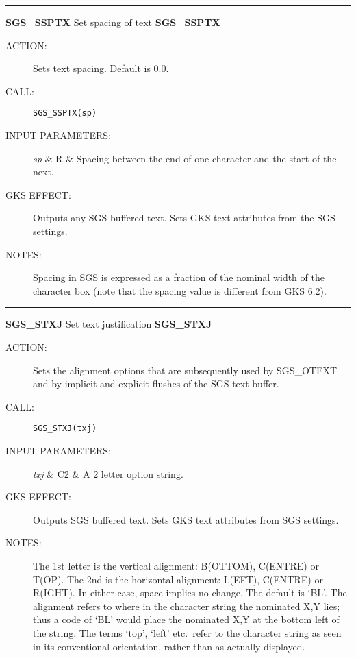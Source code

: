 \rule{\textwidth}{0.3mm}
{\Large {\bf SGS\_SSPTX} \hfill Set spacing of text \hfill {\bf SGS\_SSPTX}}
\begin{description}
\item [ACTION:]
Sets text spacing.
Default is 0.0.
\item [CALL:]
{\tt SGS\_SSPTX(sp)}
\item [INPUT PARAMETERS:]
\begin{params}
{\em sp}  & R  & Spacing between the end of one character and the start of the
next.
\end{params}
\item [GKS EFFECT:]
Outputs any SGS buffered text.
Sets GKS text attributes from the SGS settings.
\item [NOTES:]
Spacing in SGS is expressed as a fraction of the nominal width of the character
box (note that the spacing value is different from GKS 6.2).
\end{description}
\goodbreak

\rule{\textwidth}{0.3mm}
{\Large {\bf SGS\_STXJ} \hfill Set text justification \hfill {\bf SGS\_STXJ}}
\begin{description}
\item [ACTION:]
Sets the alignment options that are subsequently used by SGS\_OTEXT
and by implicit and explicit flushes of the SGS text buffer.
\item [CALL:]
{\tt SGS\_STXJ(txj)}
\item [INPUT PARAMETERS:]
\begin{params}
{\em txj}  & C2  & A 2 letter option string.
\end{params}
\item [GKS EFFECT:]
Outputs SGS buffered text.
Sets GKS text attributes from SGS settings.
\item [NOTES:]
The 1st letter is the vertical alignment: B(OTTOM), C(ENTRE) or T(OP).
The 2nd is the horizontal alignment: L(EFT), C(ENTRE) or R(IGHT).
In either case, space implies no change.
The default is `BL'.
The alignment refers to where in the character string the nominated X,Y lies;
thus a code of `BL' would place the nominated X,Y at the bottom left of the
string.
The terms `top', `left' etc.\ refer to the character string as seen in its
conventional orientation, rather than as actually displayed.
\end{description}
\goodbreak

